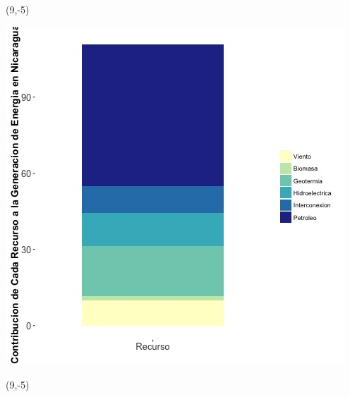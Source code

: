 \documentclass{article}\usepackage[]{graphicx}\usepackage[]{color}
\newenvironment{knitrout}{}{} %
\begin{document}
 \begin{textblock}{1}(9,-5)
\begin{minipage}{20em}
\begingroup

\endgroup
\end{minipage}
\end{textblock}

 \vspace{2cm}

\begin{knitrout}
\color{fgcolor}
\includegraphics[scale=0.65]{figure/gridplot2.jpg} 
\end{knitrout}

 \begin{textblock}{1}(9,-5)
\begin{minipage}{20em}
\begingroup

\endgroup
\end{minipage}
\end{textblock}
\end{document}
